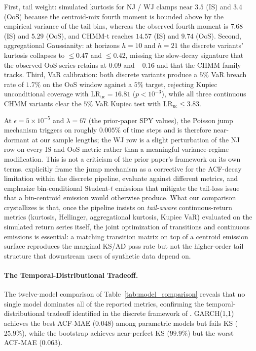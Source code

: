 First, tail weight: simulated kurtosis for NJ / WJ clamps near $3.5$ (IS) and $3.4$ (OoS) because the centroid-mix fourth moment is bounded above by the empirical variance of the tail bins, whereas the observed fourth moment is $7.68$ (IS) and $5.29$ (OoS), and CHMM-t reaches $14.57$ (IS) and $9.74$ (OoS).
Second, aggregational Gaussianity: at horizons $h = 10$ and $h = 21$ the discrete variants' kurtosis collapses to $\leq 0.47$ and $\leq 0.42$, missing the slow-decay signature that the observed OoS series retains at $0.09$ and $-0.16$ and that the CHMM family tracks.
Third, VaR calibration: both discrete variants produce a $5\%$ VaR breach rate of $1.7\%$ on the OoS window against a $5\%$ target, rejecting Kupiec unconditional coverage with $\text{LR}_{\text{uc}} = 16.81$ ($p < 10^{-3}$), while all three continuous CHMM variants clear the $5\%$ VaR Kupiec test with $\text{LR}_{\text{uc}} \leq 3.83$.

At $\epsilon = 5 \times 10^{-5}$ and $\lambda = 67$ (the prior-paper SPY values), the Poisson jump mechanism triggers on roughly $0.005\%$ of time steps and is therefore near-dormant at our sample lengths; the WJ row is a slight perturbation of the NJ row on every IS and OoS metric rather than a meaningful variance-regime modification.
This is not a criticism of the prior paper's framework on its own terms.
\citet{alswaidan2026hybrid} explicitly frame the jump mechanism as a corrective for the ACF-decay limitation within the discrete pipeline, evaluate against different metrics, and emphasize bin-conditional Student-$t$ emissions that mitigate the tail-loss issue that a bin-centroid emission would otherwise produce.
What our comparison crystallizes is that, once the pipeline insists on \emph{tail-aware} continuous-return metrics (kurtosis, Hellinger, aggregational kurtosis, Kupiec VaR) evaluated on the simulated return series itself, the joint optimization of transitions and continuous emissions is essential: a matching transition matrix on top of a centroid emission surface reproduces the marginal KS/AD pass rate but not the higher-order tail structure that downstream users of synthetic data depend on.

\paragraph{The Temporal-Distributional Tradeoff.}
The twelve-model comparison of Table~\ref{tab:model_comparison} reveals that no single model dominates all of the reported metrics, confirming the temporal-distributional tradeoff identified in the discrete framework of \citet{alswaidan2026hybrid}.
GARCH(1,1) achieves the best ACF-MAE ($0.048$) among parametric models but fails KS ($25.9\%$), while the bootstrap achieves near-perfect KS ($99.9\%$) but the worst ACF-MAE ($0.063$).

